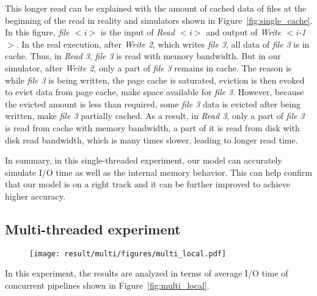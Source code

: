 \documentclass[conference]{IEEEtran}
\newcommand{\tristan}[1]{\color{orange}\textbf{From Tristan:}#1\color{black}}
\begin{document}
			This longer read can be explained with the amount of cached data of files 
			at the beginning of the read in reality and simulators shown in 
			Figure~\ref{fig:single_cache}. 			
			In this figure, \textit{file $<$i$>$} is the input of \textit{Read $<$i$>$} and 
			output of \textit{Write $<$i-1$>$}. 
			In the real execution, after \textit{Write 2}, which writes \textit{file 3}, 
			all data of \textit{file 3} is in cache. 
			Thus, in \textit{Read 3}, \textit{file 3} is read with memory bandwidth. 
			But in our simulator, after \textit{Write 2}, only a part of \textit{file 3} 
			remains in cache. 
			The reason is while \textit{file 3}  is being written, the page cache is saturated, 
			eviction is then evoked to evict data from page cache, make space 
			available for \textit{file 3}. 
			However, because the evicted amount is less than required, 
			some \textit{file 3} data is evicted after being written, make \textit{file 3} 
			partially cached. 
			As a result, in \textit{Read 3}, only a part of \textit{file 3} is read from cache 
			with memory bandwidth, a part of it is read from disk with disk read bandwidth, 
			which is many times slower, leading to longer read time. 			
			
			In summary, in this single-threaded experiment, our model can accurately 
			simulate I/O time as well as the internal memory behavior. 
			This can help confirm that our model is on a right track and 
			it can be further improved to achieve higher accuracy.
			
		\subsection{Multi-threaded experiment}
		
			\begin{figure*}		
			\begin{subfigure}{\linewidth}
				\centering
   				\texttt{[image: result/multi/figures/multi\_local.pdf]}
			\end{subfigure}		
			\caption{I/O time of concurrent pipelines with local storage. \tristan{revise caption for real execution variability: "real execution" doesnt tell what the gray shade is.}}
			\label{fig:multi_local}
			\end{figure*}		
			
			In this experiment, the results are analyzed in terms of average I/O time 
			of concurrent pipelines shown in Figure~\ref{fig:multi_local}.
			
\end{document}
